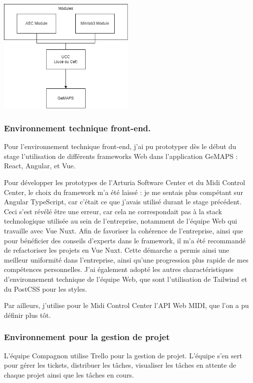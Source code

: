 \documentclass[francais]{rapportPFE}  %
\begin{document}
\begin{center}
	\centering
	\includegraphics[width=0.5\textwidth]{graphics/gmaps.png}
	\begin{tiny}
	\end{tiny}
	\label{fig}
\end{center}

\subsubsection{Environnement technique front-end.}

Pour l'environnement technique front-end, j'ai pu prototyper dès le début du stage l'utilisation de différents frameworks Web dans l'application GeMAPS : React, Angular, et Vue.  

Pour développer les prototypes de l'Arturia Software Center et du Midi Control Center, le choix du framework m'a été laissé : je me sentais plus compétant sur Angular TypeScript, car c'était ce que j'avais utilisé durant le stage précédent. Ceci s'est révélé être une erreur, car cela ne correspondait pas à la stack technologique utilisée au sein de l'entreprise, notamment de l'équipe Web qui travaille avec Vue Nuxt. Afin de favoriser la cohérence de l'entreprise, ainsi que pour bénéficier des conseils d'experts dans le framework, il m'a été recommandé de refactoriser les projets en Vue Nuxt. Cette démarche a permis ainsi une meilleur uniformité dans l'entreprise, ainsi qu'une progression plus rapide de mes compétences personnelles. J'ai également adopté les autres charactéristiques d'environnement technique de l'équipe Web, que sont l'utilisation de Tailwind et du PostCSS pour les styles. 

Par ailleurs, j'utilise pour le Midi Control Center l'API Web MIDI, que l'on a pu définir plus tôt. 

\subsubsection{Environnement pour la gestion de projet}
L'équipe Compagnon utilise Trello pour la gestion de projet. L'équipe s'en sert pour gérer les tickets, distribuer les tâches, visualiser les tâches en attente de chaque projet ainsi que les tâches en cours.
\end{document}

